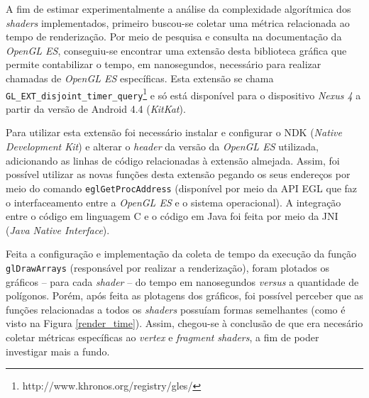 	A fim de estimar experimentalmente a análise da complexidade algorítmica dos \textit{shaders} implementados, primeiro buscou-se coletar uma métrica relacionada ao tempo de renderização. Por meio de pesquisa e consulta na documentação da \textit{OpenGL ES}, conseguiu-se encontrar uma extensão desta biblioteca gráfica que permite contabilizar o tempo, em nanosegundos, necessário para realizar chamadas de \textit{OpenGL ES} específicas. Esta extensão se chama \texttt{GL\_EXT\_disjoint\_timer\_query}\footnote{http://www.khronos.org/registry/gles/} e só está disponível para o dispositivo \textit{Nexus 4} a partir da versão de Android 4.4 (\textit{KitKat}).

	Para utilizar esta extensão foi necessário instalar e configurar o NDK (\textit{Native Development Kit}) e alterar o \textit{header} da versão da \textit{OpenGL ES} utilizada, adicionando as linhas de código relacionadas à extensão almejada. Assim, foi possível utilizar as novas funções desta extensão pegando os seus endereços por meio do comando \texttt{eglGetProcAddress} (disponível por meio da API EGL que faz o interfaceamento entre a \textit{OpenGL ES} e o sistema operacional). A integração entre o código em linguagem C e o código em Java foi feita por meio da JNI (\textit{Java Native Interface}).

	Feita a configuração e implementação da coleta de tempo da execução da função \texttt{glDrawArrays} (responsável por realizar a renderização), foram plotados os gráficos -- para cada \textit{shader} -- do tempo em nanosegundos \textit{versus} a quantidade de polígonos. Porém, após feita as plotagens dos gráficos, foi possível perceber que as funções relacionadas a todos os \textit{shaders} possuíam formas semelhantes (como é visto na Figura  \ref{render_time}). Assim, chegou-se à conclusão de que era necesário coletar métricas específicas ao \textit{vertex} e \textit{fragment} \textit{shaders}, a fim de poder investigar mais a fundo. 

